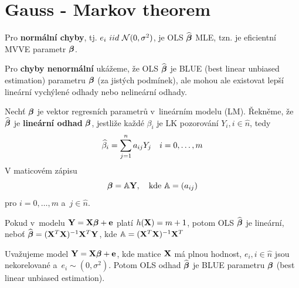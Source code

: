\section{Gauss - Markov theorem}
Pro \textbf{normální chyby}, tj. $e_i~iid~\mathcal{N}(0,\sigma^2)$, je OLS $\widehat{\boldsymbol{\beta}}$ MLE, tzn. je eficientní MVVE parametr $\boldsymbol{\beta}$.

Pro \textbf{chyby nenormální} ukážeme, že OLS $\widehat{\boldsymbol{\beta}}$ je BLUE (best linear unbiased estimation) parametru $\boldsymbol{\beta}$ (za jistých podmínek), ale mohou ale existovat lepší lineární vychýlené odhady nebo nelineární odhady.

\begin{define}
	Nechť $\boldsymbol{\beta}$ je vektor regresních parametrů v~lineárním modelu (LM). Řekněme, že $\widehat{\boldsymbol{\beta}}$ je \textbf{lineární odhad} $\boldsymbol{\beta}$, jestliže každé $\beta_i$ je LK pozorování $Y_i, i\in\widehat{n} $, tedy
	 $$
		\widehat{\beta}_i = \sum\limits_{j=1}^{n} a_{ij} Y_j \quad i = 0,\dots,m
	 $$
V maticovém zápisu
	 $$
		\boldsymbol{\beta} = \mathbb{A} \mathbf{Y}, \quad \text{kde } \mathbb{A} = (a_{ij})
	 $$
pro $i = 0,\dots, m$ a~$j  \in\widehat{n} $.
\end{define}
\begin{remark}
 Pokud v~modelu $\mathbf{Y} = \mathbf{X} \boldsymbol{\beta} + \mathbf{e}$ platí $h(\mathbf{X}) = m+1$, potom OLS $\widehat{\boldsymbol{\beta}}$ je lineární, neboť $\widehat{\boldsymbol{\beta}} = (\mathbf{X}^T \mathbf{X})^{-1} \mathbf{X}^T \mathbf{Y}$, kde $\mathbb{A} = (\mathbf{X}^T \mathbf{X})^{-1} \mathbf{X}^T$
\end{remark}
\begin{theorem}
	Uvažujeme model $\mathbf{Y} = \mathbf{X} \boldsymbol{\beta} + \mathbf{e}$, kde matice $\mathbf{X}$ má plnou hodnost, $e_i, i\in\widehat{n} $ jsou nekorelované a~$e_i \sim (0, \sigma^2)$. Potom OLS odhad $\widehat{\boldsymbol{\beta}}$ je BLUE parametru $\boldsymbol{\beta}$ (best linear unbiased estimation).
\end{theorem}
